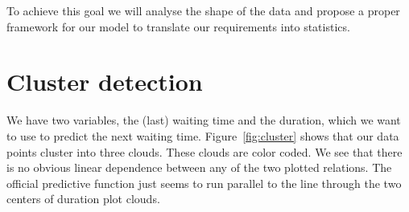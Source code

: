 \documentclass[english,final]{scrartcl}
\begin{document}
To achieve this goal we will analyse the shape of the data and propose a proper framework for our model to translate our requirements into statistics.


\section{Cluster detection}
\label{sec:data}

We have two variables, the (last) waiting time and the duration, which we want to use to predict the next waiting time. Figure~\ref{fig:cluster} shows that our data points cluster into three clouds. These clouds are color coded. We see that there is no obvious linear dependence between any of the two plotted relations. The official predictive function just seems to run parallel to the line through the two centers of duration plot clouds.
\vspace{-0.8cm}
\end{document}
